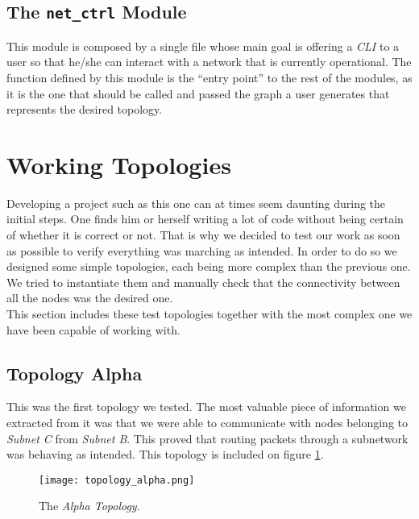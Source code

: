         \subsection{The \texttt{net\_ctrl} Module}
            This module is composed by a single file whose main goal is offering a \textit{CLI} to a user so that he/she can interact with a network that is currently operational. The function defined by this module is the ``entry point'' to the rest of the modules, as it is the one that should be called and passed the graph a user generates that represents the desired topology.\\

            

    \section{Working Topologies} \label{sec:working-tops}
        Developing a project such as this one can at times seem daunting during the initial steps. One finds him or herself writing a lot of code without being certain of whether it is correct or not. That is why we decided to test our work as soon as possible to verify everything was marching as intended. In order to do so we designed some simple topologies, each being more complex than the previous one. We tried to instantiate them and manually check that the connectivity between all the nodes was the desired one.\\

        This section includes these test topologies together with the most complex one we have been capable of working with.\\

        \subsection{Topology Alpha}
            This was the first topology we tested. The most valuable piece of information we extracted from it was that we were able to communicate with nodes belonging to \textit{Subnet C} from \textit{Subnet B}. This proved that routing packets through a subnetwork was behaving as intended. This topology is included on figure \ref{fig:top-alpha}.\\

            \begin{figure}
                \centering
                \texttt{[image: topology\_alpha.png]}
                \caption{The \textit{Alpha Topology}.}
                \label{fig:top-alpha}
            \end{figure}

